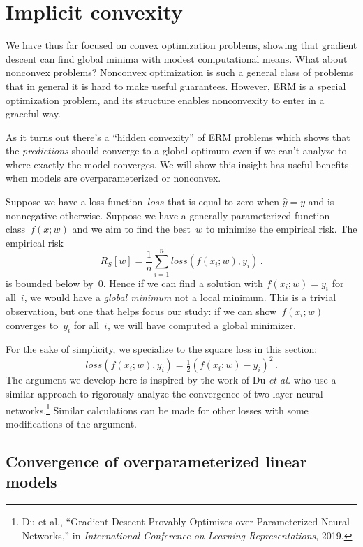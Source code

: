 \documentclass{tufte-book}
\begin{document}
\hypertarget{implicit-convexity}{%
\section{Implicit convexity}\label{implicit-convexity}}


We have thus far focused on convex optimization problems, showing that
gradient descent can find global minima with modest computational means.
What about nonconvex problems? Nonconvex optimization is such a general
class of problems that in general it is hard to make useful guarantees.
However, ERM is a special optimization problem, and its structure
enables nonconvexity to enter in a graceful way.

As it turns out there's a ``hidden convexity'' of ERM problems which
shows that the \emph{predictions} should converge to a global optimum
even if we can't analyze to where exactly the model converges. We will
show this insight has useful benefits when models are overparameterized
or nonconvex.

Suppose we have a loss function~\(\mathit{loss}\) that is equal to zero
when \(\hat{y} = y\) and is nonnegative otherwise. Suppose we have a
generally parameterized function class~\(f(x;w)\) and we aim to find the
best~\(w\) to minimize the empirical risk. The empirical risk \[
R_S[w] =\frac{1}{n} \sum_{i=1}^n \mathit{loss}(f(x_i;w),y_i)\,.
\] is bounded below by~\(0\). Hence if we can find a solution with
\(f(x_i;w)=y_i\) for all~\(i\), we would have a \emph{global minimum}
not a local minimum. This is a trivial observation, but one that helps
focus our study: if we can show~\(f(x_i;w)\) converges to~\(y_i\) for
all~\(i\), we will have computed a global minimizer.

For the sake of simplicity, we specialize to the square loss in this
section: \[
 \mathit{loss}(f(x_i;w),y_i) =  \tfrac{1}{2} (f(x_i;w)-y_i)^2\,.
\] The argument we develop here is inspired by the work of Du \emph{et
al.} who use a similar approach to rigorously analyze the convergence of
two layer neural networks.\footnote{Du et al., {``Gradient Descent
  Provably Optimizes over-Parameterized Neural Networks,''} in
  \emph{International Conference on Learning Representations}, 2019.}
Similar calculations can be made for other losses with some
modifications of the argument.

\hypertarget{convergence-of-overparameterized-linear-models}{%
\subsection{Convergence of overparameterized linear
models}\label{convergence-of-overparameterized-linear-models}}
\end{document}
